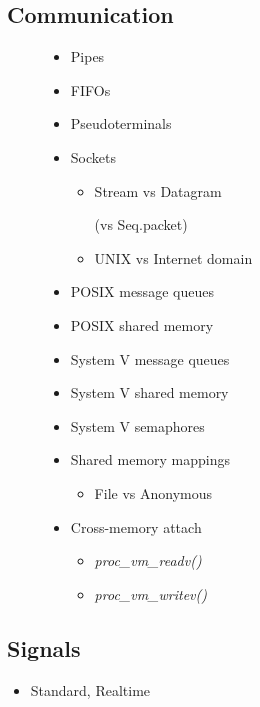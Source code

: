 \documentclass[../../lectures.tex]{subfiles}
\begin{document}
\subsection{Communication}
\begin{figure}[H]
\begin{minipage}[c]{0.5\linewidth}
\begin{itemize}
    \item Pipes
    \item FIFOs
    \item Pseudoterminals
    \item Sockets
          \begin{itemize}
            \item Stream vs Datagram 

                  (vs Seq.packet)
            \item UNIX vs Internet domain
          \end{itemize}
    \item POSIX message queues
    \item POSIX shared memory
\end{itemize}
\end{minipage}
\hspace{0.5cm}
\begin{minipage}[c]{0.5\linewidth}
\begin{itemize}
    \item System V message queues
    \item System V shared memory
    \item System V semaphores
    \item Shared memory mappings
          \begin{itemize}
            \item File vs Anonymous
          \end{itemize}
    \item Cross-memory attach
          \begin{itemize}
            \item \emph{proc\_vm\_readv()} 
            \item \emph{proc\_vm\_writev()}
          \end{itemize}
\end{itemize}
\end{minipage}
\end{figure}

\subsection{Signals}
\begin{itemize}
    \item Standard, Realtime
\end{itemize}
\end{document}
